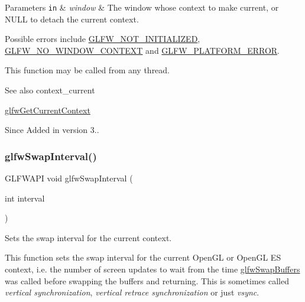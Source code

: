 \begin{DoxyParams}[1]{Parameters}
\mbox{\tt in}  & {\em window} & The window whose context to make current, or {\ttfamily N\+U\+LL} to detach the current context.\\
\hline
\end{DoxyParams}
Possible errors include \hyperlink{group__errors_ga2374ee02c177f12e1fa76ff3ed15e14a}{G\+L\+F\+W\+\_\+\+N\+O\+T\+\_\+\+I\+N\+I\+T\+I\+A\+L\+I\+Z\+ED}, \hyperlink{group__errors_gacff24d2757da752ae4c80bf452356487}{G\+L\+F\+W\+\_\+\+N\+O\+\_\+\+W\+I\+N\+D\+O\+W\+\_\+\+C\+O\+N\+T\+E\+XT} and \hyperlink{group__errors_gad44162d78100ea5e87cdd38426b8c7a1}{G\+L\+F\+W\+\_\+\+P\+L\+A\+T\+F\+O\+R\+M\+\_\+\+E\+R\+R\+OR}.

This function may be called from any thread.

\begin{DoxySeeAlso}{See also}
context\+\_\+current 

\hyperlink{group__context_gab5fde1ef6238bfb82c7a2293f86172de}{glfw\+Get\+Current\+Context}
\end{DoxySeeAlso}
\begin{DoxySince}{Since}
Added in version 3.. 
\end{DoxySince}
\mbox{\label{group__context_ga12a595c06947cec4967c6e1f14210a8a}} 
\subsubsection{\texorpdfstring{glfw\+Swap\+Interval()}{glfwSwapInterval()}}
{\footnotesize\ttfamily G\+L\+F\+W\+A\+PI void glfw\+Swap\+Interval (\begin{DoxyParamCaption}\item[{int}]{interval }\end{DoxyParamCaption})}



Sets the swap interval for the current context. 

This function sets the swap interval for the current Open\+GL or Open\+GL ES context, i.\+e. the number of screen updates to wait from the time \hyperlink{group__window_gafb827800eedbfcbc97b1e5408df668d7}{glfw\+Swap\+Buffers} was called before swapping the buffers and returning. This is sometimes called {\itshape vertical synchronization}, {\itshape vertical retrace synchronization} or just {\itshape vsync}.

